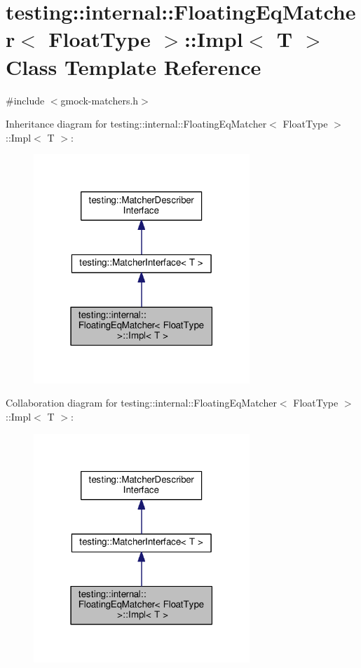 \hypertarget{classtesting_1_1internal_1_1FloatingEqMatcher_1_1Impl}{}\section{testing\+:\+:internal\+:\+:Floating\+Eq\+Matcher$<$ Float\+Type $>$\+:\+:Impl$<$ T $>$ Class Template Reference}
\label{classtesting_1_1internal_1_1FloatingEqMatcher_1_1Impl}


{\ttfamily \#include $<$gmock-\/matchers.\+h$>$}



Inheritance diagram for testing\+:\+:internal\+:\+:Floating\+Eq\+Matcher$<$ Float\+Type $>$\+:\+:Impl$<$ T $>$\+:\nopagebreak
\begin{figure}[H]
\begin{center}
\leavevmode
\includegraphics[width=231pt]{classtesting_1_1internal_1_1FloatingEqMatcher_1_1Impl__inherit__graph}
\end{center}
\end{figure}


Collaboration diagram for testing\+:\+:internal\+:\+:Floating\+Eq\+Matcher$<$ Float\+Type $>$\+:\+:Impl$<$ T $>$\+:\nopagebreak
\begin{figure}[H]
\begin{center}
\leavevmode
\includegraphics[width=231pt]{classtesting_1_1internal_1_1FloatingEqMatcher_1_1Impl__coll__graph}
\end{center}
\end{figure}
